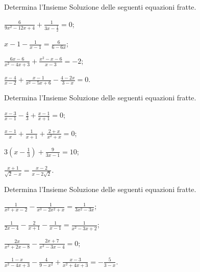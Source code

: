 \begin{esercizio}[\Ast]
\label{ese:3.42}
Determina l'Insieme Soluzione delle seguenti equazioni fratte.
\begin{multicols}{2}
\begin{enumeratea}
\item $\frac{6}{9 x^{2}-12 x + 4} + \frac{1}{3 x-\frac{1}{2}} =0$;
\item $x-1-\frac{1}{x-1} = \frac{6}{6-6 x}$;
\item $\frac{6 x-6}{x^{2}-4 x + 3} + \frac{x^{2}-x-6}{x-3}=-2$;
\item $\frac{x-4}{x-2} + \frac{x-1}{x^{2}-5 x + 6}-\frac{4 -2 x}{3-x} = 0$.
\end{enumeratea}
\end{multicols}
\end{esercizio}

\begin{esercizio}[\Ast]
 \label{ese:3.43}
Determina l'Insieme Soluzione delle seguenti equazioni fratte.
\begin{multicols}{2}
\begin{enumeratea}
\item $\frac{x-3}{x-1}-\frac{4}{3} + \frac{x-1}{x + 1}=0$;
\item $\frac{x-1}{x} + \frac{1}{x + 1} + \frac{2 + x}{x^{2} + x} =0$;
\item $3 \left(x-\frac{1}{3} \right) + \frac{9}{3x-1} = 10$;
\item $\frac{x + 1}{\sqrt{2}-x} = \frac{x-2}{x-2 \sqrt{2}}$.
\end{enumeratea}
\end{multicols}
\end{esercizio}

\begin{esercizio}[\Ast]
 \label{ese:3.44}
Determina l'Insieme Soluzione delle seguenti equazioni fratte.
\begin{multicols}{2}
\begin{enumeratea}
\item $\frac{1}{x^{2} + x-2}-\frac{1}{x^{3}-2 x^{2} + x}=\frac{1}{3 x^{2}-3 x}$;
\item $\frac{1}{2 x-4}-\frac{2}{x + 1}-\frac{1}{x-1}=\frac{1}{x^{2}-3 x + 2}$;
\item $\frac{2 x}{x^{2} + 2 x-8}-\frac{2 x + 7}{x^{2}-3 x-4}= 0$;
\item $\frac{1-x}{x^{2}-4 x + 3}-\frac{4}{9-x^{2}} + \frac{x- 3}{x^{2} + 4 x + 3} =-\frac{5}{3-x}$.
\end{enumeratea}
\end{multicols}
\end{esercizio}

